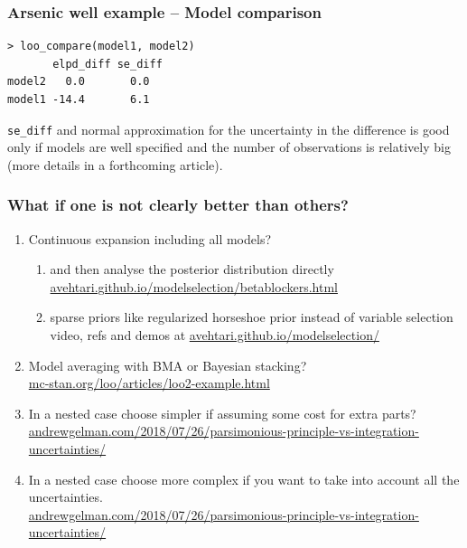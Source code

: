 \documentclass[10pt]{beamer}
\begin{document}
\begin{frame}[fragile]

\frametitle{Arsenic well example -- Model comparison}

  {\scriptsize
\begin{lstlisting}
> loo_compare(model1, model2)
       elpd_diff se_diff
model2   0.0       0.0
model1 -14.4       6.1
\end{lstlisting}}

    {\tt se\_diff} and normal approximation for the uncertainty in the
    difference is good only if models are well specified and the
    number of observations is relatively big (more details in a
    forthcoming article).


\end{frame}


\begin{frame}{}

\frametitle{What if one is not clearly better than others?}

  \begin{enumerate}
  \item<2-> Continuous expansion including all models?
    \begin{enumerate}
    \item and then analyse the posterior distribution directly\\
        {\small \url{avehtari.github.io/modelselection/betablockers.html}}
      \item sparse priors like regularized horseshoe prior instead of variable selection\\
        {\small video, refs and demos at
          \url{avehtari.github.io/modelselection/}}
    \end{enumerate}
  \item<3-> Model averaging with BMA or Bayesian stacking?\\
    {\small \url{mc-stan.org/loo/articles/loo2-example.html}}
  \item<4-> In a nested case choose simpler if assuming some cost for
    extra parts?\\
    {\small \url{andrewgelman.com/2018/07/26/parsimonious-principle-vs-integration-uncertainties/}}
  \item<5-> In a nested case choose more complex if you want to take
    into account all the uncertainties.\\
    {\small \url{andrewgelman.com/2018/07/26/parsimonious-principle-vs-integration-uncertainties/}}
  \end{enumerate}

\end{frame}
\end{document}

